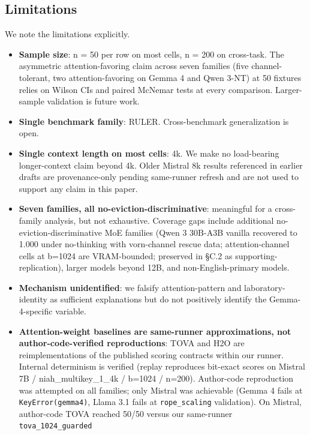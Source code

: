\documentclass[10pt]{article}
\providecommand{\tightlist}{%
 \setlength{\itemsep}{0pt}\setlength{\parskip}{0pt}}
\begin{document}
\subsection{Limitations}\label{68-limitations}

We note the limitations explicitly.

\begin{itemize}
\tightlist
\item
 \textbf{Sample size}: n = 50 per row on most cells, n = 200 on
 cross-task. The asymmetric attention-favoring claim across seven
 families (five channel-tolerant, two attention-favoring on Gemma 4
 and Qwen 3-NT) at 50 fixtures relies on Wilson CIs and paired
 McNemar tests at every comparison. Larger-sample validation is
 future work.
\item
 \textbf{Single benchmark family}: RULER. Cross-benchmark
 generalization is open.
\item
 \textbf{Single context length on most cells}: 4k. We make no
 load-bearing longer-context claim beyond 4k. Older Mistral 8k results
 referenced in earlier drafts are provenance-only pending same-runner
 refresh and are not used to support any claim in this paper.
\item
 \textbf{Seven families, all no-eviction-discriminative}: meaningful
 for a cross-family analysis, but not exhaustive. Coverage gaps
 include additional no-eviction-discriminative MoE families (Qwen 3
 30B-A3B vanilla recovered to 1.000 under no-thinking with
 vorn-channel rescue data; attention-channel cells at b=1024 are
 VRAM-bounded; preserved in \S{}C.2 as supporting-replication), larger
 models beyond 12B, and non-English-primary models.
\item
 \textbf{Mechanism unidentified}: we falsify attention-pattern and
 laboratory-identity as sufficient explanations but do not positively
 identify the Gemma-4-specific variable.
\item
 \textbf{Attention-weight baselines are same-runner approximations, not
 author-code-verified reproductions}: TOVA \citep{oren2024tova} and H2O
 \citep{zhang2023h2o} are reimplementations of the published scoring
 contracts within our runner. Internal determinism is verified (replay
 reproduces bit-exact scores on Mistral 7B / niah\_multikey\_1\_4k /
 b=1024 / n=200). Author-code reproduction was attempted on all
 families; only Mistral was achievable (Gemma 4 fails at
 \texttt{KeyError(\textquotesingle{}gemma4\textquotesingle{})}, Llama
 3.1 fails at \texttt{rope\_scaling} validation). On Mistral, author-code
 TOVA reached 50/50 versus our same-runner \texttt{tova\_1024\_guarded}

\end{itemize}
\end{document}
